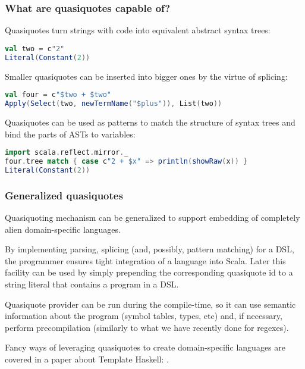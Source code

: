 \documentclass[hyperref={bookmarks=false}]{beamer}
\begin{document}
\begin{frame}[t,fragile]
\frametitle{What are quasiquotes capable of?}

Quasiquotes turn strings with code into equivalent abstract syntax trees:

\begin{lstlisting}[language=scala]
val two = c"2"
Literal(Constant(2))
\end{lstlisting}

Smaller quasiquotes can be inserted into bigger ones by the virtue of splicing:

\begin{lstlisting}[language=scala]
val four = c"$two + $two"
Apply(Select(two, newTermName("$plus")), List(two))
\end{lstlisting}%

Quasiquotes can be used as patterns to match the structure of syntax trees and bind the parts of ASTs to variables:

\begin{lstlisting}[language=scala]
import scala.reflect.mirror._
four.tree match { case c"2 + $x" => println(showRaw(x)) }
Literal(Constant(2))
\end{lstlisting}%
\end{frame}

\begin{frame}[t,fragile]
\frametitle{Generalized quasiquotes}
Quasiquoting mechanism can be generalized to support embedding of completely alien domain-specific languages.

By implementing parsing, splicing (and, possibly, pattern matching) for a DSL, the programmer ensures tight integration of a language into Scala. Later this facility can be used by simply prepending the corresponding quasiquote id to a string literal that contains a program in a DSL.

Quasiquote provider can be run during the compile-time, so it can use semantic information about the program (symbol tables, types, etc) and, if necessary, perform precompilation (similarly to what we have recently done for regexes).

Fancy ways of leveraging quasiquotes to create domain-specific languages are covered in a paper about Template Haskell: .

\end{frame}
\end{document}
